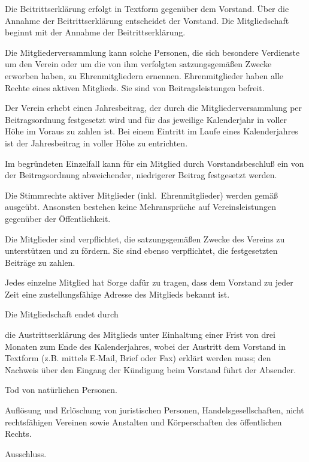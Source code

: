 \documentclass[draft]{scrartcl}
\begin{document}
\begin{contract}
Die Beitrittserklärung erfolgt in Textform gegenüber dem Vorstand. Über die
Annahme der Beitrittserklärung entscheidet der Vorstand. Die Mitgliedschaft
beginnt mit der Annahme der Beitrittserklärung.

Die Mitgliederversammlung kann solche Personen, die sich besondere Verdienste
um den Verein oder um die von ihm verfolgten satzungsgemäßen Zwecke erworben
haben, zu Ehrenmitgliedern ernennen. Ehrenmitglieder haben alle Rechte eines
aktiven Mitglieds. Sie sind von Beitragsleistungen befreit.


Der Verein erhebt einen Jahresbeitrag, der durch die Mitgliederversammlung
per Beitragsordnung festgesetzt wird und für das jeweilige Kalenderjahr in
voller Höhe im Voraus zu zahlen ist. Bei einem Eintritt im Laufe eines
Kalenderjahres ist der Jahresbeitrag in voller Höhe zu entrichten.

Im begründeten Einzelfall kann für ein Mitglied durch Vorstandsbeschluß ein
von der Beitragsordnung abweichender, niedrigerer Beitrag festgesetzt werden.


Die Stimmrechte aktiver Mitglieder (inkl.\ Ehrenmitglieder) werden gemäß
~ ausgeübt. Ansonsten bestehen
keine Mehransprüche auf Vereinsleistungen gegenüber der Öffentlichkeit.

Die Mitglieder sind verpflichtet, die satzungsgemäßen Zwecke des Vereins zu
unterstützen und zu fördern. Sie sind ebenso verpflichtet, die festgesetzten
Beiträge zu zahlen.

Jedes einzelne Mitglied hat Sorge dafür zu tragen, dass dem Vorstand zu jeder
Zeit eine zustellungsfähige Adresse des Mitglieds bekannt ist.


Die Mitgliedschaft endet durch

\begin{compactitem}
  \item die Austrittserklärung des Mitglieds unter Einhaltung einer Frist von
  drei Monaten zum Ende des Kalenderjahres, wobei der Austritt dem Vorstand in 
  Textform (z.B. mittels E-Mail, Brief oder Fax) erklärt werden muss; den Nachweis 
  über den Eingang der Kündigung beim Vorstand führt der Absender.
  \item Tod von natürlichen Personen.
  \item Auf\/lösung und Erlöschung von juristischen Personen, Handelsgesellschaften,
  nicht rechtsfähigen Vereinen sowie Anstalten und Körperschaften des öffentlichen
  Rechts.
  \item Ausschluss.
\end{compactitem}


\end{contract}
\end{document}
